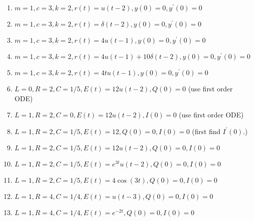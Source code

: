 \begin{enumerate}
\item $m = 1, c = 3, k=2, r(t)=u(t-2), y(0)=0,y^\prime(0)=0$
\item $m = 1, c = 3, k=2, r(t)=\delta(t-2), y(0)=0,y^\prime(0)=0$
\item $m = 1, c = 3, k=2, r(t)=4u(t-1), y(0)=0,y^\prime(0)=0$
\item $m = 1, c = 3, k=2, r(t)=4u(t-1)+10\delta(t-2), y(0)=0,y^\prime(0)=0$
\item $m = 1, c = 3, k=2, r(t)=4t u(t-1), y(0)=0,y^\prime(0)=0$

\item $L = 0, R = 2, C=1/5, E(t)=12 u(t-2), Q(0)=0$ (use first order ODE)
\item $L = 1, R = 2, C=0, E(t)=12 u(t-2), I(0)=0$ (use first order ODE)
\item $L = 1, R = 2, C=1/5, E(t)=12, Q(0)=0,I(0)=0$ (first find $I^\prime(0)$.)
\item $L = 1, R = 2, C=1/5, E(t)=12 u(t-2), Q(0)=0,I(0)=0$
\item $L = 1, R = 2, C=1/5, E(t)=e^{3t} u(t-2), Q(0)=0,I(0)=0$
\item $L = 1, R = 2, C=1/5, E(t)=4\cos (3t), Q(0)=0,I(0)=0$
\item $L = 1, R = 4, C=1/4, E(t)=u(t-3), Q(0)=0,I(0)=0$
\item $L = 1, R = 4, C=1/4, E(t)=e^{-2t}, Q(0)=0,I(0)=0$



\end{enumerate}




